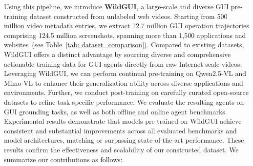 \documentclass{article}
\theoremstyle{plain}
\theoremstyle{definition}
\theoremstyle{remark}
\begin{document}
Using this pipeline, we introduce \textbf{WildGUI}, a large-scale and diverse GUI pre-training dataset constructed from unlabeled web videos. Starting from 500 million video metadata entries, we extract 12.7 million GUI operation trajectories comprising 124.5 million screenshots, spanning more than 1,500 applications and websites~(see Table~\ref{tab: dataset_comparison}). 
Compared to existing datasets, WildGUI offers a distinct advantage by sourcing diverse and comprehensive actionable training data for GUI agents directly from raw Internet-scale videos.
Leveraging WildGUI, we can perform continual pre-training on Qwen2.5-VL and Mimo-VL to enhance their generalization ability across diverse applications and environments. Further, we  conduct post-training on carefully curated open-source datasets to refine task-specific performance.
We evaluate the resulting agents on GUI grounding tasks, as well as both offline and online agent benchmarks. Experimental results demonstrate that models pre-trained on WildGUI achieve consistent and substantial improvements across all evaluated benchmarks and model architectures, matching or surpassing state-of-the-art performance. These results confirm the effectiveness and scalability of our constructed dataset. We summarize our contributions as follows:

\end{document}
